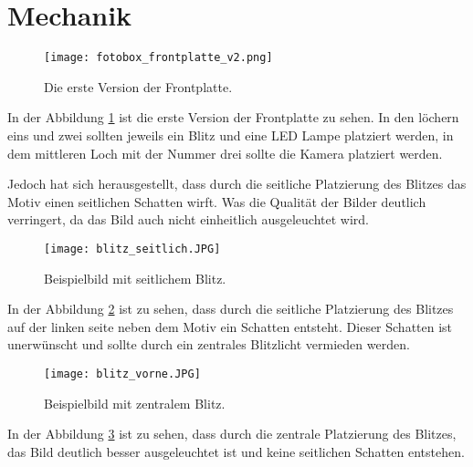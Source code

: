 \graphicspath{{images/mechanics}}

\section{Mechanik}
\begin{figure}[H]
    \centering
    \texttt{[image: fotobox\_frontplatte\_v2.png]}
    \caption{Die erste Version der Frontplatte.}
    \label{fig:frontplatte_v1}
\end{figure}

In der Abbildung \ref{fig:frontplatte_v1} ist die erste Version der Frontplatte zu sehen.
In den löchern eins und zwei sollten jeweils ein Blitz und eine LED Lampe platziert werden,
in dem mittleren Loch mit der Nummer drei sollte die Kamera platziert werden.


Jedoch hat sich herausgestellt, dass durch die seitliche Platzierung des Blitzes
das Motiv einen seitlichen Schatten wirft. Was die Qualität der Bilder deutlich verringert,
da das Bild auch nicht einheitlich ausgeleuchtet wird.

\newpage
\begin{figure}[H]
    \centering
    \texttt{[image: blitz\_seitlich.JPG]}
    \caption{Beispielbild mit seitlichem Blitz.}
    \label{fig:seitlicher_blitzt}
\end{figure}

In der Abbildung \ref{fig:seitlicher_blitzt} ist zu sehen, dass durch die seitliche Platzierung des Blitzes 
auf der linken seite neben dem Motiv ein Schatten entsteht. Dieser Schatten ist unerwünscht und sollte
durch ein zentrales Blitzlicht vermieden werden.

\begin{figure}[H]
    \centering
    \texttt{[image: blitz\_vorne.JPG]}
    \caption{Beispielbild mit zentralem Blitz.}
    \label{fig:zentraler_blitz}
\end{figure}

In der Abbildung \ref{fig:zentraler_blitz} ist zu sehen, dass durch die zentrale Platzierung des Blitzes,
das Bild deutlich besser ausgeleuchtet ist und keine seitlichen Schatten entstehen. 